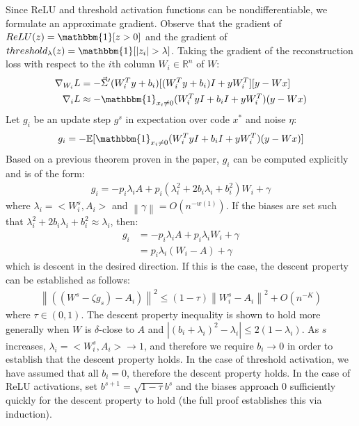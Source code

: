 Since ReLU and threshold activation functions can be
nondifferentiable, we formulate an approximate gradient. Observe that
the gradient of $ReLU(z)=\mathbbm{1}[z>0]$ and the gradient of
$threshold_{\lambda} (z) = \mathbbm{1}[|z_i|>\lambda]$. Taking the
gradient of the reconstruction loss with respect to the $i$th column
$W_i \in \mathbb{R}^n$ of $W$:
\begin{align*}
    \nabla _{W_i} L &= -\vec{\Sigma}' (W_i ^T y + b_i) [(W_i ^T y +
    b_i )I+yW_i^T][y - Wx] \\
    \nabla_i L & \approx -\mathbbm{1}_{x_i \neq 0} (W_i ^T y I +b_i
    I+yW_i ^T) (y-Wx)
\end{align*}
Let $g_i$ be an update step $g^s$ in expectation over code $x^*$ and
noise $\eta$:
\begin{align*}
    g_i = -\mathbb{E}[\mathbbm{1}_{x_i \neq 0} (W_i ^T y I +b_i
    I+yW_i ^T) (y-Wx)]\\
\end{align*}
Based on a previous theorem proven in the paper, $g_i$ can be
computed explicitly and is of the form:
\begin{align*}
    g_i = -p_i \lambda_i A + p_i (\lambda_i ^2 +2b_i
    \lambda_i+b_i^2)W_i + \gamma
\end{align*}
where $\lambda_i=<W_i ^s , A_i>$ and $\left \lVert \gamma \right
\rVert =O(n^{-w(1)})$. If the biases are set such that $\lambda_i ^2
+2b_i \lambda_i +b_i ^2 \approx \lambda_i$, then:
\begin{align*}
    g_i &= -p_i \lambda_i A + p_i \lambda_i W_i + \gamma \\
    &= p_i \lambda_i (W_i - A) + \gamma
\end{align*}
which is descent in the desired direction. If this is the case, the
descent property can be established as follows:
\begin{align*}
    \left \lVert ((W^s - \zeta g_s)- A_i) \right \rVert^2 \leq (1-\tau) \left \lVert W_i ^s -A_i \right \rVert ^2 + O(n^{-K})
\end{align*}
where $\tau \in (0,1)$. The descent property inequality is shown to
hold more generally when $W$ is $\delta$-close to $A$ and $|(b_i +
\lambda_i)^2 - \lambda_i| \leq 2(1-\lambda_i)$. As $s$ increases,
$\lambda_i = <W_i ^s, A_i> \rightarrow 1$, and therefore we require
$b_i \rightarrow 0$ in order to establish that the descent property
holds. In the case of threshold activation, we have assumed that all
$b_i=0$, therefore the descent property holds. In the case of ReLU
activations, set $b^{s+1} = \sqrt{1-\tau} b^s$ and the biases
approach 0 sufficiently quickly for the descent property to hold (the
full proof establishes this via induction).

